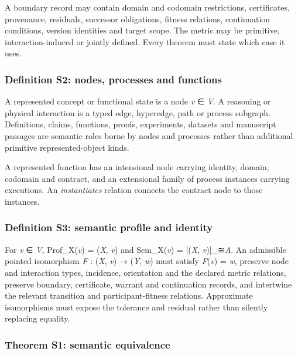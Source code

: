 A boundary record may contain domain and codomain restrictions,
certificates, provenance, residuals, successor obligations, fitness
relations, continuation conditions, version identities and target scope.
The metric may be primitive, interaction-induced or jointly defined.
Every theorem must state which case it uses.

\hypertarget{definition-s2-nodes-processes-and-functions}{%
\subsubsection{Definition S2: nodes, processes and
functions}\label{definition-s2-nodes-processes-and-functions}}

A represented concept or functional state is a node \emph{v} ∈ \emph{V}.
A reasoning or physical interaction is a typed edge, hyperedge, path or
process subgraph. Definitions, claims, functions, proofs, experiments,
datasets and manuscript passages are semantic roles borne by nodes and
processes rather than additional primitive represented-object kinds.

A represented function has an intensional node carrying identity,
domain, codomain and contract, and an extensional family of process
instances carrying executions. An \emph{instantiates} relation connects
the contract node to those instances.

\hypertarget{definition-s3-semantic-profile-and-identity}{%
\subsubsection{Definition S3: semantic profile and
identity}\label{definition-s3-semantic-profile-and-identity}}

For \emph{v} ∈ \emph{V}, Prof\_X(\emph{v}) = (\emph{X}, \emph{v}) and
Sem\_X(\emph{v}) = {[}(\emph{X}, \emph{v}){]}\_≅\emph{A}. An admissible
pointed isomorphism \emph{F} : (\emph{X}, \emph{v}) → (\emph{Y},
\emph{w}) must satisfy \emph{F}(\emph{v}) = \emph{w}, preserve node and
interaction types, incidence, orientation and the declared metric
relations, preserve boundary, certificate, warrant and continuation
records, and intertwine the relevant transition and participant-fitness
relations. Approximate isomorphisms must expose the tolerance and
residual rather than silently replacing equality.

\hypertarget{theorem-s1-semantic-equivalence}{%
\subsubsection{Theorem S1: semantic
equivalence}\label{theorem-s1-semantic-equivalence}}

